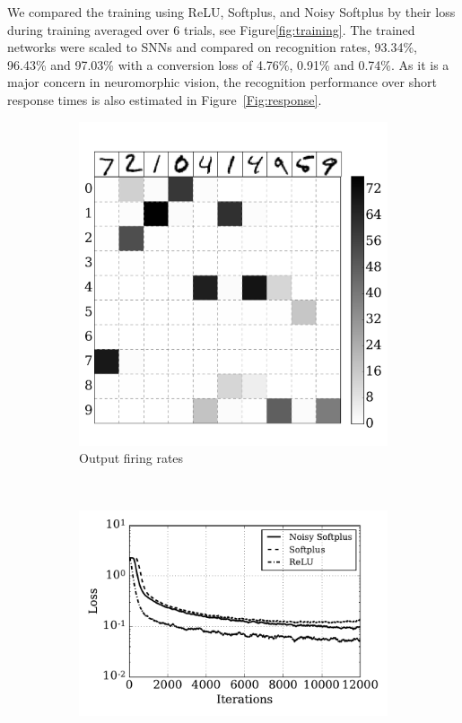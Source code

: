 	
	We compared the training using ReLU, Softplus, and Noisy Softplus by their loss during training averaged over 6 trials, see Figure\ref{fig:training}.
	The trained networks were scaled to SNNs and compared on recognition rates, 93.34\%, 96.43\% and 97.03\% with a conversion loss of 4.76\%, 0.91\% and 0.74\%.
	As it is a major concern in neuromorphic vision, the recognition performance over short response times is also estimated in Figure~\ref{Fig:response}.
	\begin{figure}[bt!]
		\centering
		\begin{subfigure}[t]{0.6\textwidth}
			\includegraphics[width=\textwidth]{pics_iconip/7.pdf}
		    \caption{Output firing rates}
		    \label{Fig:out}
		\end{subfigure}
		\\
		\begin{subfigure}[t]{0.7\textwidth}
			\includegraphics[width=\textwidth]{pics_iconip/8.pdf}

\end{subfigure}
\end{figure}
